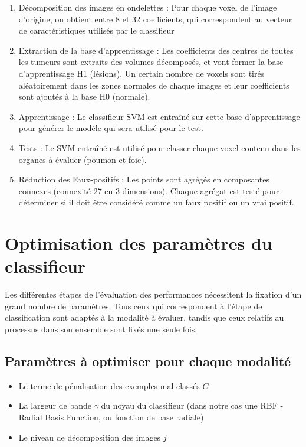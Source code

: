 \begin{enumerate}
 \item Décomposition des images en ondelettes : Pour chaque voxel de l'image d'origine, on obtient entre 8 et 32 coefficients, qui correspondent au vecteur de caractéristiques utilisés par le classifieur
 \item Extraction de la base d'apprentissage : Les coefficients des centres de toutes les tumeurs sont extraits des volumes décomposés, et vont former la base d'apprentissage H1 (lésions). Un certain nombre de voxels sont tirés aléatoirement dans les zones normales de chaque images et leur coefficients sont ajoutés à la base H0 (normale).
 \item Apprentissage : Le classifieur SVM est entraîné sur cette base d'apprentissage pour générer le modèle qui sera utilisé pour le test.
 \item Tests : Le SVM entraîné est utilisé pour classer chaque voxel contenu dans les organes à évaluer (poumon et foie).
 \item Réduction des Faux-positifs : Les points sont agrégés en composantes connexes (connexité 27 en 3 dimensions). Chaque agrégat est testé pour déterminer si il doit être considéré comme un faux positif ou un vrai positif.
\end{enumerate}

\section{Optimisation des paramètres du classifieur}
\label{lab:optim}

Les différentes étapes de l'évaluation des performances nécessitent la fixation d'un grand nombre de paramètres. Tous ceux qui correspondent à l'étape de classification sont adaptés à la modalité à évaluer, tandis que ceux relatifs au processus dans son ensemble sont fixés une seule fois.

\subsection{Paramètres à optimiser pour chaque modalité}

\begin{itemize}
 \item Le terme de pénalisation des exemples mal classés $C$
 \item La largeur de bande $\gamma$ du noyau du classifieur (dans notre cas une RBF - Radial Basis Function, ou fonction de base radiale)
 \item Le niveau de décomposition des images $j$
\end{itemize}

